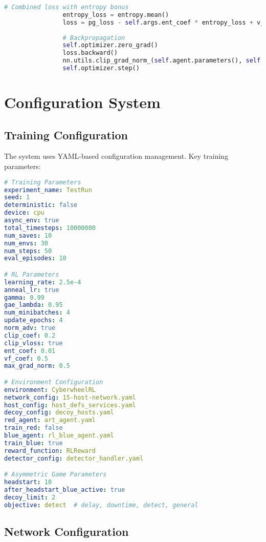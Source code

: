\documentclass[12pt,a4paper]{article}
\begin{document}
\begin{lstlisting}[language=Python, caption=PPO Training Core Logic]
                # Combined loss with entropy bonus
                entropy_loss = entropy.mean()
                loss = pg_loss - self.args.ent_coef * entropy_loss + v_loss * self.args.vf_coef
                
                # Backpropagation
                self.optimizer.zero_grad()
                loss.backward()
                nn.utils.clip_grad_norm_(self.agent.parameters(), self.args.max_grad_norm)
                self.optimizer.step()
\end{lstlisting}

\section{Configuration System}

\subsection{Training Configuration}

The system uses YAML-based configuration management. Key training parameters:

\begin{lstlisting}[language=yaml, caption=Training Configuration Example]
# Training Parameters
experiment_name: TestRun
seed: 1
deterministic: false
device: cpu
async_env: true
total_timesteps: 10000000
num_saves: 10
num_envs: 30
num_steps: 50
eval_episodes: 10

# RL Parameters
learning_rate: 2.5e-4
anneal_lr: true
gamma: 0.99
gae_lambda: 0.95
num_minibatches: 4
update_epochs: 4
norm_adv: true
clip_coef: 0.2
clip_vloss: true
ent_coef: 0.01
vf_coef: 0.5
max_grad_norm: 0.5

# Environment Configuration
environment: CyberwheelRL
network_config: 15-host-network.yaml
host_config: host_defs_services.yaml
decoy_config: decoy_hosts.yaml
red_agent: art_agent.yaml
train_red: false
blue_agent: rl_blue_agent.yaml
train_blue: true
reward_function: RLReward
detector_config: detector_handler.yaml

# Asymmetric Game Parameters
headstart: 10
after_headstart_blue_active: true
decoy_limit: 2
objective: detect  # delay, downtime, detect, general
\end{lstlisting}

\subsection{Network Configuration}
\end{document}
